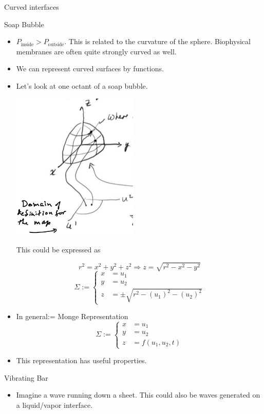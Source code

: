 \documentclass{article}
\begin{document}
	  \begin{section}{Curved interfaces}
	    \begin{subsection}{Soap Bubble}
	      \begin{itemize}
		\item $P_{\mathrm{inside}} > P_{\mathrm{outside}}$. This is related to the curvature of the sphere. Biophysical membranes are often quite strongly curved as well.
		\item We can represent curved surfaces by functions. 

		\item Let's look at one octant of a soap bubble.
	      
		  \includegraphics[height=200pt]{Day4NotesPics/sphereMap}
	       
		  This could be expressed as

		$$r^2 = x^2 + y^2 + z^2 \Rightarrow z = \sqrt{r^2 - x^2 - y^2}$$
		$$\Sigma := \begin{cases} 
		  x &= u_1\\
		  y &= u_2\\ 
		z &= \pm\sqrt{r^2 - (u_1)^2 - (u_2)^2}\end{cases}$$

		\item  In general:= Monge Representation
		  $$\Sigma := \begin{cases} 
		    x &= u_1 \\
		    y &= u_2 \\
		  z &= f(u_1, u_2, t)\end{cases}$$
		  \item This representation has useful properties.
		\end{itemize}
	      \end{subsection}

	      \begin{subsection}{Vibrating Bar}
		\begin{itemize}
		\item Imagine a wave running down a sheet. This could also be waves generated on a liquid/vapor interface.


\end{itemize}
\end{subsection}
\end{section}
\end{document}

